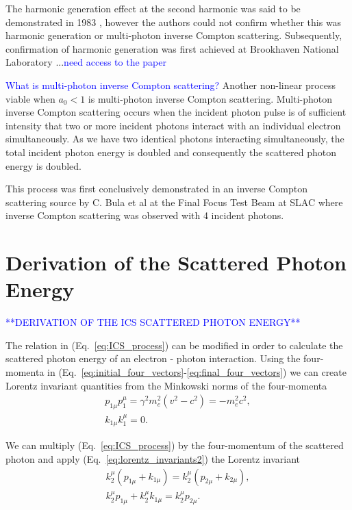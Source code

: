 \documentclass[../main.tex]{subfiles}
\begin{document}
The harmonic generation effect at the second harmonic was said to be demonstrated in 1983 \cite{englert1983second}, however the authors could not confirm whether this was harmonic generation or multi-photon inverse Compton scattering. Subsequently, confirmation of harmonic generation was first achieved at Brookhaven National Laboratory \cite{babzien2006observation,kumita2006observation}...\textcolor{blue}{need access to the paper} 

\textcolor{blue}{What is multi-photon inverse Compton scattering?}
Another non-linear process viable when $a_{0} < 1$ is multi-photon inverse Compton scattering. Multi-photon inverse Compton scattering occurs when the incident photon pulse is of sufficient intensity that two or more incident photons interact with an individual electron simultaneously. As we have two identical photons interacting simultaneously, the total incident photon energy is doubled and consequently the scattered photon energy is doubled.

This process was first conclusively demonstrated in an inverse Compton scattering source by C. Bula et al \cite{bula1996observation} at the Final Focus Test Beam at SLAC \cite{burke1994results} where inverse Compton scattering was observed with 4 incident photons.



\section{Derivation of the Scattered Photon Energy}
\label{sec:derivation_of_the_scattered_photon_energy}
\textcolor{blue}{**DERIVATION OF THE ICS SCATTERED PHOTON ENERGY**}

The relation in (Eq.~\ref{eq:ICS_process}) can be modified in order to calculate the scattered photon energy of an electron - photon interaction. Using the four-momenta in (Eq.~\ref{eq:initial_four_vectors}-\ref{eq:final_four_vectors}) we can create Lorentz invariant quantities from the Minkowski norms of the four-momenta 
\begin{gather}
p_{1\mu}p_{1}^{\mu} = \gamma^{2}m_{e}^{2}\left(v^{2}-c^{2}\right) = -m_{e}^{2}c^{2},
\label{eq:lorentz_invariants1} \\
k_{1\mu}k_{1}^{\mu} = 0.
\label{eq:lorentz_invariants2}
\end{gather}

We can multiply (Eq.~\ref{eq:ICS_process}) by the four-momentum  of the scattered photon and apply (Eq.~\ref{eq:lorentz_invariants2}) the Lorentz invariant 
\begin{gather}
k_{2}^{\mu}\left(p_{1\mu} + k_{1\mu}\right) = k_{2}^{\mu}\left(p_{2\mu} + k_{2\mu}\right), \\
k_{2}^{\mu}p_{1\mu}+k_{2}^{\mu}k_{1\mu} = k_{2}^{\mu}p_{2\mu}.
\label{eq:apply_photon_pfinal}
\end{gather}
\end{document}
